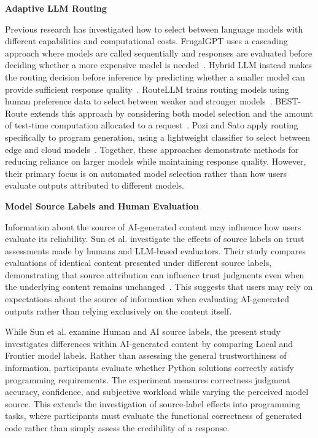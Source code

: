 \documentclass[manuscript,review]{acmart}
\begin{document}
\noindent\textbf{Adaptive LLM Routing}\par
\noindent Previous research has investigated how to select between language models with different capabilities and computational costs. FrugalGPT uses a cascading approach where models are called sequentially and responses are evaluated before deciding whether a more expensive model is needed~\cite{chen2024frugalgpt}. Hybrid LLM instead makes the routing decision before inference by predicting whether a smaller model can provide sufficient response quality~\cite{ding2024hybridllm}. RouteLLM trains routing models using human preference data to select between weaker and stronger models~\cite{ong2025routellm}. BEST-Route extends this approach by considering both model selection and the amount of test-time computation allocated to a request~\cite{ding2025bestroute}. Pozi and Sato apply routing specifically to program generation, using a lightweight classifier to select between edge and cloud models~\cite{pozi2025routing}. Together, these approaches demonstrate methods for reducing reliance on larger models while maintaining response quality. However, their primary focus is on automated model selection rather than how users evaluate outputs attributed to different models.

\noindent\textbf{Model Source Labels and Human Evaluation}\par
\noindent Information about the source of AI-generated content may influence how users evaluate its reliability. Sun et al. investigate the effects of source labels on trust assessments made by humans and LLM-based evaluators. Their study compares evaluations of identical content presented under different source labels, demonstrating that source attribution can influence trust judgments even when the underlying content remains unchanged~\cite{sun-etal-2026-label}. This suggests that users may rely on expectations about the source of information when evaluating AI-generated outputs rather than relying exclusively on the content itself.

While Sun et al. examine Human and AI source labels, the present study investigates differences within AI-generated content by comparing Local and Frontier model labels. Rather than assessing the general trustworthiness of information, participants evaluate whether Python solutions correctly satisfy programming requirements. The experiment measures correctness judgment accuracy, confidence, and subjective workload while varying the perceived model source. This extends the investigation of source-label effects into programming tasks, where participants must evaluate the functional correctness of generated code rather than simply assess the credibility of a response.
\end{document}

